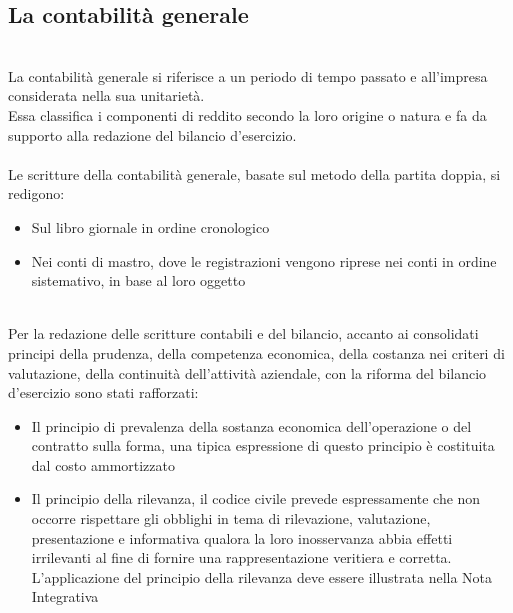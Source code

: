 \documentclass{report}
\begin{document}
\subsection{La contabilità generale} %
\label{sec:La contabilità generale}
\\
La contabilità generale si riferisce a un periodo di tempo passato e all'impresa considerata nella sua unitarietà. \\
Essa classifica i componenti di reddito secondo la loro origine o natura e fa da supporto alla redazione del bilancio d'esercizio.
\\
\\
Le scritture della contabilità generale, basate sul metodo della partita doppia, si redigono:
\\
\begin{itemize}
  \item{Sul libro giornale in ordine cronologico}
  \item{Nei conti di mastro, dove le registrazioni vengono riprese nei conti in ordine sistemativo, in base al loro oggetto}
\end{itemize}
\\
Per la redazione delle scritture contabili e del bilancio, accanto ai consolidati principi della prudenza, della competenza economica, della costanza nei criteri di valutazione, della continuità dell'attività aziendale, con la riforma del bilancio d'esercizio sono stati rafforzati:
\\
\begin{itemize}
  \item{Il principio di prevalenza della sostanza economica dell'operazione o del contratto sulla forma, una tipica espressione di questo principio è costituita dal costo ammortizzato}
  \item{Il principio della rilevanza, il codice civile prevede espressamente che non occorre rispettare gli obblighi in tema di rilevazione, valutazione, presentazione e informativa qualora la loro inosservanza abbia effetti irrilevanti al fine di fornire una rappresentazione veritiera e corretta.
    L'applicazione del principio della rilevanza deve essere illustrata nella Nota Integrativa}
\end{itemize}
\\
\end{document}
